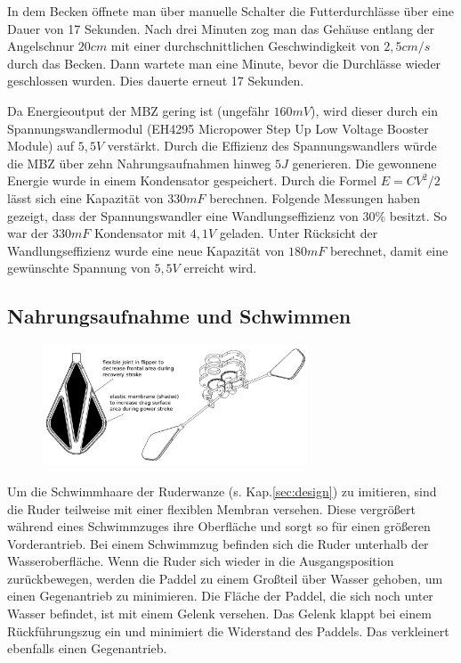 \documentclass{SeminarV2}
\begin{document}
In dem Becken öffnete man über manuelle Schalter die Futterdurchlässe über eine Dauer von 17 Sekunden. Nach drei Minuten zog man das Gehäuse entlang der Angelschnur $20cm$ mit einer durchschnittlichen Geschwindigkeit von $2,5cm/s$ durch das Becken. Dann wartete man eine Minute, bevor die Durchlässe wieder geschlossen wurden. Dies dauerte erneut 17 Sekunden.\cite[S. 3890]{DBLP:conf/iros/PhilamoreRSI15}

Da Energieoutput der MBZ gering ist (ungefähr $160mV$), wird dieser durch ein Spannungswandlermodul (EH4295  Micropower  Step  Up  Low  Voltage  Booster Module) auf $5,5V$ verstärkt. Durch die Effizienz des Spannungswandlers würde die MBZ über zehn Nahrungsaufnahmen hinweg $5J$ generieren. Die gewonnene Energie wurde in einem Kondensator gespeichert. Durch die Formel $E=CV^2/2$ lässt sich eine Kapazität von $330mF$ berechnen. Folgende Messungen haben gezeigt, dass der Spannungswandler eine Wandlungseffizienz von $30\%$ besitzt. So war der $330mF$ Kondensator mit $4,1V$ geladen. Unter Rücksicht der Wandlungseffizienz wurde eine neue Kapazität von $180mF$ berechnet, damit eine gewünschte Spannung von $5,5V$ erreicht wird.\cite[S. 3890]{DBLP:conf/iros/PhilamoreRSI15}

\subsection{Nahrungsaufnahme und Schwimmen}
\begin{figure}[ht]
\centering
\includegraphics[width=0.7\textwidth]{pics/ruder}
\end{figure}

Um die Schwimmhaare der Ruderwanze (s. Kap.\ref{sec:design}) zu imitieren, sind die Ruder teilweise mit einer flexiblen Membran versehen. Diese vergrößert während eines Schwimmzuges ihre Oberfläche und sorgt so für einen größeren Vorderantrieb. Bei einem Schwimmzug befinden sich die Ruder unterhalb der Wasseroberfläche. Wenn die Ruder sich wieder in die Ausgangsposition zurückbewegen, werden die Paddel zu einem Großteil über Wasser gehoben, um einen Gegenantrieb zu minimieren. Die Fläche der Paddel, die sich noch unter Wasser befindet, ist mit einem Gelenk versehen. Das Gelenk klappt bei einem Rückführungszug ein und minimiert die Widerstand des Paddels. Das verkleinert ebenfalls einen Gegenantrieb.\cite[S. 3890 f.]{DBLP:conf/iros/PhilamoreRSI15}
\end{document}
